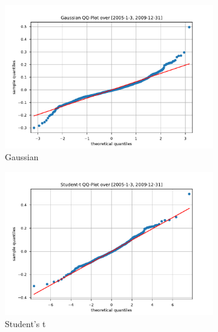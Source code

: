 \begin{figure}[htbp]
    \centering
    \begin{subfigure}[b]{0.32\textwidth}
        \centering
        \includegraphics[width=\textwidth]{content/reschap4/Figures/gauss_QQ_2005-1-3-2009-12-31.pdf}
        \caption{\small Gaussian}
    \end{subfigure}
    \hfill
    \begin{subfigure}[b]{0.32\textwidth}
        \centering
        \includegraphics[width=\textwidth]{content/reschap4/Figures/student_QQ_2005-1-3-2009-12-31.pdf}
        \caption{\small Student's t}
    \end{subfigure}
    \hfill
    \begin{subfigure}[b]{0.32\textwidth}
        \centering

\end{subfigure}
\end{figure}

